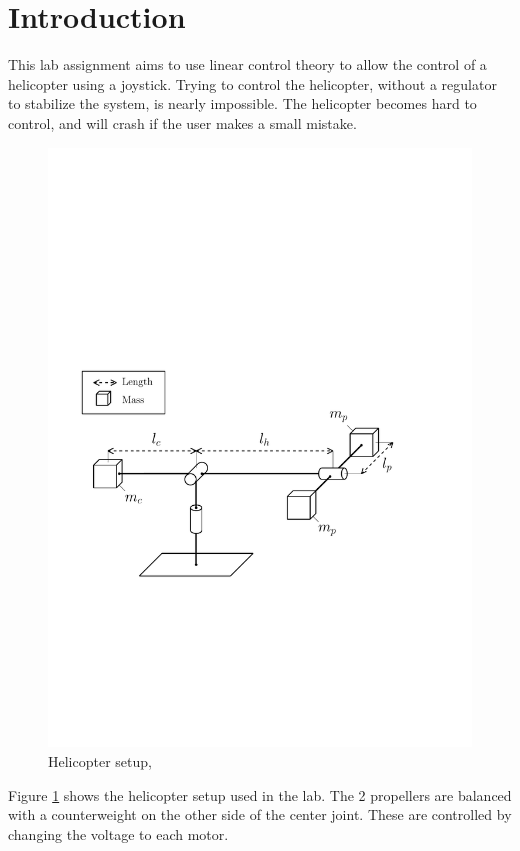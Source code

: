 \section{Introduction}
This lab assignment aims to use linear control theory to allow the control of a helicopter using a joystick. Trying to control the helicopter, without a regulator to stabilize the system, is nearly impossible. The helicopter becomes hard to control, and will crash if the user makes a small mistake.

\begin{figure}[htb]
	\centering
	\includegraphics[width=0.9\linewidth]{images/helicopter.pdf}
    \caption{Helicopter setup, \cite{HeliLabAssignment}}
    \label{fig:setup}
\end{figure}


Figure \ref{fig:setup} shows the helicopter setup used in the lab. The 2 propellers are balanced with a counterweight on the other side of the center joint. These are controlled by changing the voltage to each motor. \medskip

